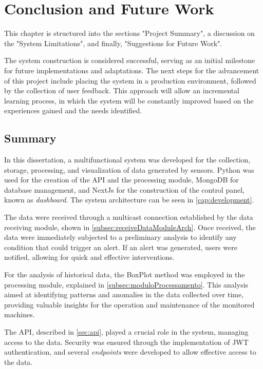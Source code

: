 \chapter{Conclusion and Future Work}\label{chap:conclusion_and_future_work}

This chapter is structured into the sections "Project Summary", a discussion on the "System Limitations", and finally, "Suggestions for Future Work". 

The system construction is considered successful, serving as an initial milestone for future implementations and adaptations. The next steps for the advancement of this project include placing the system in a production environment, followed by the collection of user feedback. This approach will allow an incremental learning process, in which the system will be constantly improved based on the experiences gained and the needs identified. 

\section{Summary}\label{sec:summary}
In this dissertation, a multifunctional system was developed for the collection, storage, processing, and visualization of data generated by sensors. Python was used for the creation of the \gls{API} and the processing module, MongoDB for database management, and NextJs for the construction of the control panel, known as \emph{dashboard}. The system architecture can be seen in \ref{cap:development}.

The data were received through a multicast connection established by the data receiving module, shown in \ref{subsec:receiveDataModuleArch}. Once received, the data were immediately subjected to a preliminary analysis to identify any condition that could trigger an alert. If an alert was generated, users were notified, allowing for quick and effective interventions.

For the analysis of historical data, the BoxPlot method was employed in the processing module, explained in \ref{subsec:moduloProcessamento}. This analysis aimed at identifying patterns and anomalies in the data collected over time, providing valuable insights for the operation and maintenance of the monitored machines.

The \gls{API}, described in \ref{sec:api}, played a crucial role in the system, managing access to the data. Security was ensured through the implementation of \gls{JWT} authentication, and several \emph{endpoints} were developed to allow effective access to the data.

